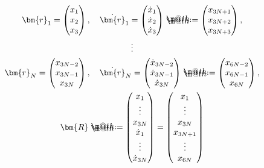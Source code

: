 \documentclass[openany, a4paper, oneside]{jsbook}
\makeatletter
\newcommand*{\defeq}{\mathrel{\rlap{%
\raisebox{0.3ex}{$\m@th\cdot$}}%
\raisebox{-0.3ex}{$\m@th\cdot$}}%
=}
\theoremstyle{break}
\theoremstyle{breakdefn}
\makeatother
\begin{document}
\begin{gather}
\bm{r}_1 =
\begin{pmatrix}
x_1 \\
x_2 \\
x_3 \\
\end{pmatrix}
, \quad
\dot{ \bm{r} }_1
=
\begin{pmatrix}
\dot{ x }_1 \\
\dot{ x }_2 \\
\dot{ x }_3 \\
\end{pmatrix}
\defeq
\begin{pmatrix}
x_{3N+1} \\
x_{3N+2} \\
x_{3N+3}\\
\end{pmatrix} , \\
\vdots \\
\bm{r}_N =
\begin{pmatrix}
x_{3N-2} \\
x_{3N-1} \\
x_{3N} \\
\end{pmatrix}
, \quad
\dot{ \bm{r} }_N
=
\begin{pmatrix}
\dot{ x }_{3N-2} \\
\dot{ x }_{3N-1} \\
\dot{ x }_{3N} \\
\end{pmatrix}
\defeq
\begin{pmatrix}
x_{6N-2} \\
x_{6N-1} \\
x_{6N} \\
\end{pmatrix} , \\
\bm{R}
\defeq
\begin{pmatrix}
x_1 \\
\vdots \\
x_{3N} \\
\dot{x}_1 \\
\vdots \\
\dot{x}_{3N}
\end{pmatrix}
=
\begin{pmatrix}
x_1 \\
\vdots \\
x_{3N} \\
x_{3N+1} \\
\vdots \\
x_{6N}
\end{pmatrix}

\end{gather}
\end{document}
